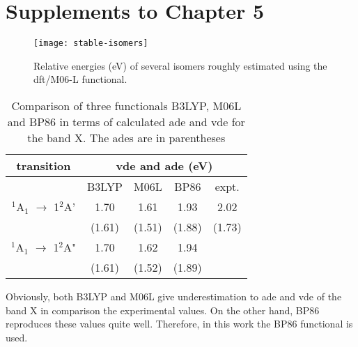 

\chapter{Supplements to Chapter 5}\label{appendix:a5}





\begin{figure}[htb!]
	\centering
	\texttt{[image: stable-isomers]}
	\caption{Relative energies (eV) of several  isomers roughly estimated using the \acrshort{dft}/M06-L functional.}
	\label{a5fig:isomers}
\end{figure}




\begin{table}[htbp!]
	\centering
	\caption{Comparison of three functionals B3LYP, M06L and BP86 in terms of calculated \acrshort{ade} and \acrshort{vde} for the band X. The \acrshort{ade}s are in parentheses}
	\label{a5tbl:selectFun}
	\begin{tabular}{@{}ccccc@{}}
	\toprule
	transition & \multicolumn{4}{c}{\acrshort{vde} and \acrshort{ade} (eV)} \\ \midrule
			                    & B3LYP   & M06L    & BP86    & expt.  \\
	$^1$A$_1$ $\longrightarrow$ 1$^2$A'   & 1.70    & 1.61    & 1.93    & 2.02   \\
			                    & (1.61)  & (1.51)  & (1.88)  & (1.73) \\
	$^1$A$_1$ $\longrightarrow$ 1$^2$A"   & 1.70    & 1.62    & 1.94    &        \\
			                    & (1.61)  & (1.52)  & (1.89)  &        \\ \bottomrule
	\end{tabular}
	\end{table}



Obviously, both B3LYP and M06L give underestimation to \acrshort{ade} and \acrshort{vde} of the band X in comparison the experimental values. On the other hand, BP86 reproduces these values quite well. Therefore, in this work the BP86 functional is used.




